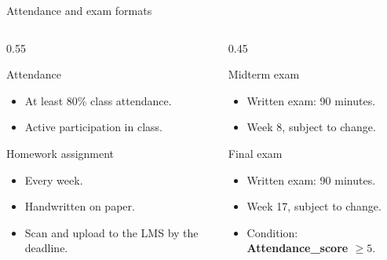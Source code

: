 \documentclass[aspectratio=169]{beamer}
\begin{document}
\begin{frame}{Attendance and exam formats}
  \begin{columns}[T]
    \begin{column}{0.55\textwidth}
      \begin{block}{Attendance}
        \begin{itemize}
          \item At least 80\% class attendance.
          \item Active participation in class.
        \end{itemize}
      \end{block}

      \begin{exampleblock}{Homework assignment}
        \begin{itemize}
          \item Every week.
          \item Handwritten on paper.
          \item Scan and upload to the LMS by the deadline.
        \end{itemize}
      \end{exampleblock}
    \end{column}

    \begin{column}{0.45\textwidth}
      \begin{exampleblock}{Midterm exam}
        \begin{itemize}
          \item Written exam: 90 minutes.
          \item Week 8, subject to change.
        \end{itemize}
      \end{exampleblock}
      \begin{alertblock}{Final exam}
        \begin{itemize}
          \item Written exam: 90 minutes.
          \item Week 17, subject to change.
          \item Condition: \textbf{Attendance\_score $\ge 5$}.
        \end{itemize}
      \end{alertblock}
    \end{column}
  \end{columns}
\end{frame}
\end{document}
